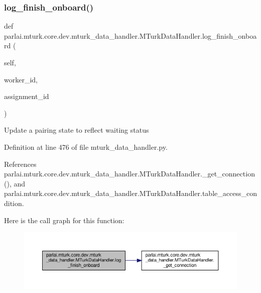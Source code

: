 \subsubsection{\texorpdfstring{log\+\_\+finish\+\_\+onboard()}{log\_finish\_onboard()}}
{\footnotesize\ttfamily def parlai.\+mturk.\+core.\+dev.\+mturk\+\_\+data\+\_\+handler.\+M\+Turk\+Data\+Handler.\+log\+\_\+finish\+\_\+onboard (\begin{DoxyParamCaption}\item[{}]{self,  }\item[{}]{worker\+\_\+id,  }\item[{}]{assignment\+\_\+id }\end{DoxyParamCaption})}

\begin{DoxyVerb}Update a pairing state to reflect waiting status\end{DoxyVerb}
 

Definition at line 476 of file mturk\+\_\+data\+\_\+handler.\+py.



References parlai.\+mturk.\+core.\+dev.\+mturk\+\_\+data\+\_\+handler.\+M\+Turk\+Data\+Handler.\+\_\+get\+\_\+connection(), and parlai.\+mturk.\+core.\+dev.\+mturk\+\_\+data\+\_\+handler.\+M\+Turk\+Data\+Handler.\+table\+\_\+access\+\_\+condition.

Here is the call graph for this function\+:
\nopagebreak
\begin{figure}[H]
\begin{center}
\leavevmode
\includegraphics[width=350pt]{classparlai_1_1mturk_1_1core_1_1dev_1_1mturk__data__handler_1_1MTurkDataHandler_a520efb5a04ffab6b689c0562997f76e0_cgraph}
\end{center}
\end{figure}
\mbox{\label{classparlai_1_1mturk_1_1core_1_1dev_1_1mturk__data__handler_1_1MTurkDataHandler_a97043bdbc4faa87164cd1e9d71559327}} 
